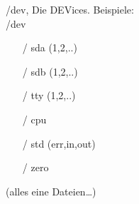 \begin{frame}{/dev, Die DEVices.}
Beispiele:\\
/dev
\begin{itemize}
 \item [/] sda (1,2,..)
 \item [/] sdb (1,2,..)
 \item [/] tty (1,2,..)
 \item [/] cpu
 \item [/] std (err,in,out)
 \item [/] zero
\end{itemize}
(alles eine Dateien…)
\end{frame}

